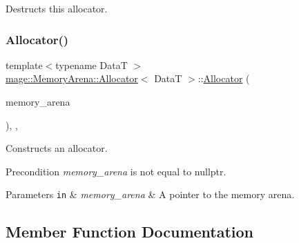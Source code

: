 Destructs this allocator. \hypertarget{structmage_1_1_memory_arena_1_1_allocator_a10a6ea82aab121d4e04efa004a49910b}{}\label{structmage_1_1_memory_arena_1_1_allocator_a10a6ea82aab121d4e04efa004a49910b} 
\subsubsection{\texorpdfstring{Allocator()}{Allocator()}\hspace{0.1cm}{\footnotesize\ttfamily [4/4]}}
{\footnotesize\ttfamily template$<$typename DataT $>$ \\
\hyperlink{structmage_1_1_memory_arena_1_1_allocator}{mage\+::\+Memory\+Arena\+::\+Allocator}$<$ DataT $>$\+::\hyperlink{structmage_1_1_memory_arena_1_1_allocator}{Allocator} (\begin{DoxyParamCaption}\item[{\hyperlink{classmage_1_1_memory_arena}{Memory\+Arena} $\ast$}]{memory\+\_\+arena }\end{DoxyParamCaption})\hspace{0.3cm}{\ttfamily [explicit]}, {\ttfamily [private]}, {\ttfamily [noexcept]}}

Constructs an allocator.

\begin{DoxyPrecond}{Precondition}
{\itshape memory\+\_\+arena} is not equal to {\ttfamily nullptr}. 
\end{DoxyPrecond}

\begin{DoxyParams}[1]{Parameters}
\mbox{\tt in}  & {\em memory\+\_\+arena} & A pointer to the memory arena. \\
\hline
\end{DoxyParams}


\subsection{Member Function Documentation}
\hypertarget{structmage_1_1_memory_arena_1_1_allocator_a0c93aee3ba1247b1ad34b304f00418fd}{}\label{structmage_1_1_memory_arena_1_1_allocator_a0c93aee3ba1247b1ad34b304f00418fd} 
